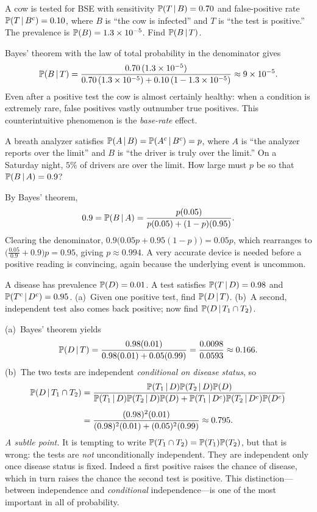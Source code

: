 \begin{example}
A cow is tested for BSE with sensitivity $\mathbb{P}(T\,|\, B)=0.70$ and
false-positive rate $\mathbb{P}(T\,|\, B^c)=0.10$, where $B$ is ``the cow is
infected'' and $T$ is ``the test is positive.'' The prevalence is
$\mathbb{P}(B)=1.3\times10^{-5}$. Find $\mathbb{P}(B\,|\, T)$.

\solution Bayes' theorem with the law of total probability in the denominator
gives
\[
  \mathbb{P}(B\,|\, T)=\frac{0.70\,(1.3\times10^{-5})}
   {0.70\,(1.3\times10^{-5})+0.10\,(1-1.3\times10^{-5})}\approx 9\times10^{-5}.
\]
Even after a positive test the cow is almost certainly healthy: when a
condition is extremely rare, false positives vastly outnumber true positives.
This counterintuitive phenomenon is the \emph{base-rate} effect.
\end{example}

\begin{example}
A breath analyzer satisfies $\mathbb{P}(A\,|\, B)=\mathbb{P}(A^c\,|\, B^c)=p$, where $A$
is ``the analyzer reports over the limit'' and $B$ is ``the driver is truly over
the limit.'' On a Saturday night, $5\%$ of drivers are over the limit. How
large must $p$ be so that $\mathbb{P}(B\,|\, A)=0.9$?

\solution By Bayes' theorem,
\[
  0.9=\mathbb{P}(B\,|\, A)=\frac{p(0.05)}{p(0.05)+(1-p)(0.95)}.
\]
Clearing the denominator,
$0.9\bigl(0.05p+0.95(1-p)\bigr)=0.05p$, which rearranges to
$\bigl(\tfrac{0.05}{0.9}+0.9\bigr)p=0.95$, giving $p\approx 0.994$. A very
accurate device is needed before a positive reading is convincing, again
because the underlying event is uncommon.
\end{example}

\begin{example}
A disease has prevalence $\mathbb{P}(D)=0.01$. A test satisfies $\mathbb{P}(T\,|\, D)=0.98$
and $\mathbb{P}(T^c\,|\, D^c)=0.95$. (a)~Given one positive test, find
$\mathbb{P}(D\,|\, T)$. (b)~A second, independent test also comes back positive; now
find $\mathbb{P}(D\,|\, T_1\cap T_2)$.

\solution (a)~Bayes' theorem yields
\[
  \mathbb{P}(D\,|\, T)=\frac{0.98(0.01)}{0.98(0.01)+0.05(0.99)}
   =\frac{0.0098}{0.0593}\approx 0.166.
\]
(b)~The two tests are independent \emph{conditional on disease status}, so
\begin{align*}
  \mathbb{P}(D\,|\, T_1\cap T_2)
   &=\frac{\mathbb{P}(T_1\,|\, D)\mathbb{P}(T_2\,|\, D)\mathbb{P}(D)}
   {\mathbb{P}(T_1\,|\, D)\mathbb{P}(T_2\,|\, D)\mathbb{P}(D)+\mathbb{P}(T_1\,|\, D^c)\mathbb{P}(T_2\,|\, D^c)\mathbb{P}(D^c)}\\[4pt]
   &=\frac{(0.98)^2(0.01)}{(0.98)^2(0.01)+(0.05)^2(0.99)}\approx 0.795.
\end{align*}
\emph{A subtle point.} It is tempting to write
$\mathbb{P}(T_1\cap T_2)=\mathbb{P}(T_1)\mathbb{P}(T_2)$, but that is wrong: the tests are
\emph{not} unconditionally independent. They are independent only once disease
status is fixed. Indeed a first positive raises the chance of disease, which in
turn raises the chance the second test is positive. This distinction—between
independence and \emph{conditional} independence—is one of the most important
in all of probability.
\end{example}

